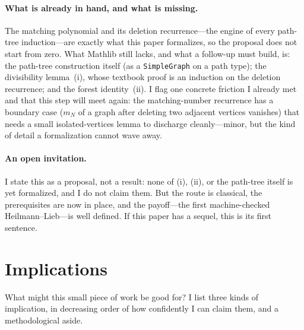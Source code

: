 \documentclass[11pt]{article}
\newcommand{\lean}[1]{\texttt{#1}}
\begin{document}
\paragraph{What is already in hand, and what is missing.}
The matching polynomial and its deletion recurrence---the engine of every
path-tree induction---are exactly what this paper formalizes, so the proposal
does not start from zero. What Mathlib still lacks, and what a follow-up must
build, is: the path-tree construction itself (as a \lean{SimpleGraph} on a path
type); the divisibility lemma~(i), whose textbook proof is an induction on the
deletion recurrence; and the forest identity~(ii). I flag one concrete
friction I already met and that this step will meet again: the matching-number
recurrence has a boundary case ($m_N$ of a graph after deleting two adjacent
vertices vanishes) that needs a small isolated-vertices lemma to discharge
cleanly---minor, but the kind of detail a formalization cannot wave away.

\paragraph{An open invitation.}
I state this as a proposal, not a result: none of (i), (ii), or the path-tree
itself is yet formalized, and I do not claim them. But the route is classical,
the prerequisites are now in place, and the payoff---the first machine-checked
Heilmann--Lieb---is well defined. If this paper has a sequel, this is its first
sentence.

\section{Implications}
\label{sec:implications}

What might this small piece of work be good for? I list three kinds of
implication, in decreasing order of how confidently I can claim them, and a
methodological aside.
\end{document}
